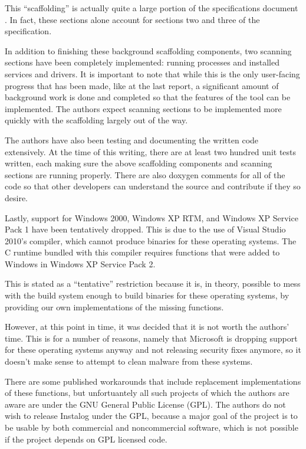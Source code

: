 \documentclass[letterpaper,12pt]{article}
\begin{document}
This ``scaffolding'' is actually quite a large portion of the specifications
document \cite{Specification}.  In fact, these sections alone account for
sections two and three of the specification.

In addition to finishing these background scaffolding components, two scanning
sections have been completely implemented: running processes and installed
services and drivers.  It is important to note that while this is the only
user-facing progress that has been made, like at the last report, a significant
amount of background work is done and completed so that the features of the tool
can be implemented.  The authors expect scanning sections to be implemented more
quickly with the scaffolding largely out of the way.

The authors have also been testing and documenting the written code extensively.
At the time of this writing, there are at least two hundred unit tests written,
each making sure the above scaffolding components and scanning sections are
running properly.  There are also doxygen comments for all of the code so that
other developers can understand the source and contribute if they so desire.

Lastly, support for Windows 2000, Windows XP RTM, and Windows XP Service Pack 1
have been tentatively dropped. This is due to the use of Visual Studio 2010's
compiler, which cannot produce binaries for these operating systems.
The C runtime bundled with this compiler requires functions that were added to
Windows in Windows XP Service Pack 2.

This is stated as a ``tentative'' restriction because it is, in theory,
possible to mess with the build system enough to build binaries
for these operating systems, by providing our own implementations of the
missing functions.

However, at this point in time, it was decided that it is not worth the authors' time.
This is for a number of reasons, namely
that Microsoft is dropping support for these operating systems anyway and not
releasing security fixes anymore, so it doesn't make sense to attempt to clean
malware from these systems. 

There are some published workarounds that include replacement implementations of
these functions, but unfortuantely all such projects of which the authors are
aware are under the GNU General Public License (GPL). The authors do not wish
to release Instalog under the GPL, because a major goal of the project is to be
usable by both commercial and noncommercial software, which is not possible if
the project depends on GPL licensed code.
\end{document}
